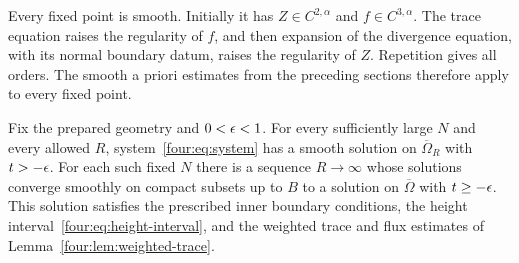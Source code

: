 Every fixed point is smooth.  Initially it has $Z\in C^{2,\alpha}$
and $f\in C^{3,\alpha}$.  The trace equation raises the regularity of
$f$, and then expansion of the divergence equation, with its normal
boundary datum, raises the regularity of $Z$.  Repetition gives all
orders.  The smooth a priori estimates from the preceding sections
therefore apply to every fixed point.

\begin{proposition}\label{four:prop:existence}
Fix the prepared geometry and $0<\epsilon<1$.  For every sufficiently large
$N$ and every allowed $R$, system~\eqref{four:eq:system} has a smooth
solution on $\overline\Omega_R$ with $t>-\epsilon$.  For each such fixed
$N$ there is a sequence $R\to\infty$ whose solutions converge smoothly
on compact subsets up to $B$ to a solution on $\overline\Omega$ with
$t\ge-\epsilon$.  This solution satisfies the prescribed inner boundary
conditions, the height interval~\eqref{four:eq:height-interval}, and the
weighted trace and flux estimates of Lemma~\ref{four:lem:weighted-trace}.
\end{proposition}

